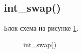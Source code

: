 \subsection{int\_swap()}

Блок-схема на рисунке \ref{fig:int_swap}.

\begin{figure}[h]
    \caption{int\_swap()}
    \label{fig:int_swap}
\end{figure}





\newpage